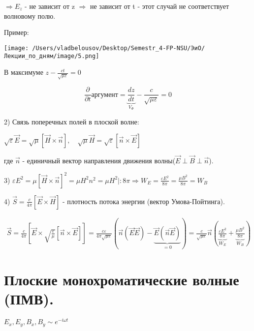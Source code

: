 \documentclass[12pt, a4paper]{report}
\begin{document}
\( \Rightarrow  E_z\) - не зависит от z \( \Rightarrow  \) не зависит от t - этот случай не соответствует волновому полю. 

Пример: 

\begin{center}
    \texttt{[image: /Users/vladbelousov/Desktop/Semestr\_4-FP-NSU/ЭиО/Лекции\_по\_дням/image/5.png]}
\end{center}

В максимуме \( \displaystyle z - \frac{c t}{ \sqrt{ \mu \varepsilon}} = 0   \) 

\[ \displaystyle \frac{\partial}{\partial t} \text{аргумент}=   \underbrace{\frac{dz}{dt} }_{V_{\Phi }  }- \frac{c}{\sqrt{ \mu \varepsilon}}=0   \] 

2) Связь поперечных полей в плоской волне: 

\( \displaystyle  \sqrt{\varepsilon} \vec{E} = \sqrt{ \mu} [\vec{H}\times \vec{n}], \quad \sqrt{\mu} \vec{H} = \sqrt{ \varepsilon} [\vec{n}\times \vec{E}] \)

где \( \vec{n } \) - единичный вектор направления движения волны(\(  \vec{E} \perp \vec{B} \perp \vec{n} \)). 

3) \( \displaystyle \varepsilon E ^2 = \mu [ \displaystyle \vec{H}\times  \vec{n }] ^2 = \mu H ^2 n ^2 = \mu H ^2 | : 8 \pi \Rightarrow W_E = \frac{\varepsilon E ^2 }{8 \pi} =\frac{\mu B ^2 }{8 \pi} = W_B  \) 

4) \( \displaystyle \vec{S}= \frac{c}{4 \pi}   [ \vec{E}\times \vec{H }] \) - плотность потока энергии (вектор Умова-Пойтинга). 

\begin{gather*}
    \displaystyle \vec{S} = \frac{c}{4 \pi} [\vec{E } \times  \sqrt{\frac{\varepsilon}{\mu} }[\vec{n }\times  \vec{E}]]= \frac{c \varepsilon}{4 \pi \sqrt{ \mu \varepsilon}} \left( \vec{n}( \vec{E}\vec{E}) - \underbrace{\vec{E}( \vec{n }\vec{E})}_{=0}   \right)= \frac{c}{\sqrt{ \mu \varepsilon}} \vec{n} \left( \underbrace{\frac{\varepsilon E ^2 }{8 \pi}}_{W_E}  +\underbrace{\frac{\mu B ^2 }{8 \pi}  }_{W_B}  \right)   
\end{gather*}

\section{Плоские монохроматические волные (ПМВ).}

\( E_x, E_y, B_x, B_y \sim e^{-i \omega t}   \) 

\text{ }
\end{document}
